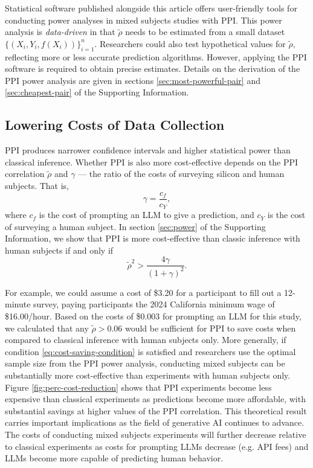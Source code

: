 \documentclass{article}
\begin{document}
Statistical software published alongside this article offers user-friendly tools for conducting power analyses in mixed subjects studies with PPI. 
This power analysis is \textit{data-driven} in that $\tilde{\rho}$ needs to be estimated from a small dataset $\{(X_i, Y_i, f(X_i))\}_{i=1}^n$. Researchers could also test hypothetical values for $\tilde{\rho},$ reflecting more or less accurate prediction algorithms. However, applying the PPI software is required to obtain precise estimates. Details on the derivation of the PPI power analysis are given in sections \ref{sec:most-powerful-pair} and \ref{sec:cheapest-pair} of the Supporting Information. 

\subsection{Lowering Costs of Data Collection}

PPI produces narrower confidence intervals and higher statistical power than classical inference. Whether PPI is also more cost-effective depends on the PPI correlation $\tilde{\rho}$ and $\gamma$ --- the ratio of the costs of surveying silicon and human subjects. That is,
\begin{equation}
    \gamma = \frac{c_f}{c_Y},
\end{equation}
where  $c_f$ is the cost of prompting an LLM to give a prediction, and $c_Y$ is the cost of surveying a human subject. In section \ref{sec:power} of the Supporting Information, we show that PPI is more cost-effective than classic inference with human subjects if and only if 
\begin{equation}\label{eq:cost-saving-condition}
\tilde{\rho}^2 > \frac{4 \gamma}{(1+\gamma)^2}.
\end{equation}

For example, we could assume a cost of \$3.20 for a participant to fill out a 12-minute survey, paying participants the 2024 California minimum wage of \$16.00/hour. Based on the costs of \$0.003 for prompting an LLM for this study, we calculated that any $\tilde{\rho}>0.06$ would be sufficient for PPI to save costs when compared to classical inference with human subjects only. More generally, if condition \eqref{eq:cost-saving-condition} is satisfied and researchers use the optimal sample size from the PPI power analysis, conducting mixed subjects can be substantially more cost-effective than experiments with human subjects only. Figure \ref{fig:perc-cost-reduction} shows that PPI experiments become less expensive than classical experiments as predictions become more affordable, with substantial savings at higher values of the PPI correlation. This theoretical result carries important implications as the field of generative AI continues to advance. The costs of conducting mixed subjects experiments will further decrease relative to classical experiments as costs for prompting LLMs decrease (e.g.  API fees) and LLMs become more capable of predicting human behavior. 
\end{document}
